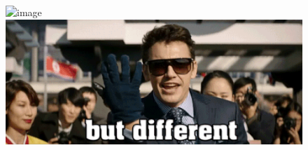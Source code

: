 \begin{frame}[fragile]
  \begin{figure}
    \centering
    \includegraphics<1->[width=0.4\linewidth]{animation/same_but_different-10.png}
    \hspace{40pt}\includegraphics[width=0.4\linewidth]{animation/same_but_different-52.png}
  \end{figure}
  
\end{frame}


